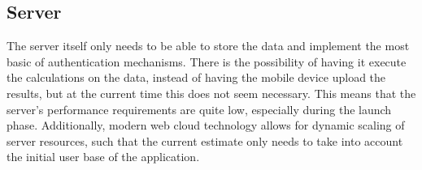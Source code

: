 \subsection{Server}
The server itself only needs to be able to store the data and implement the most
basic of authentication mechanisms. There is the possibility of having it execute
the calculations on the data, instead of having the mobile device upload the results,
but at the current time this does not seem necessary. This means that the server's
performance requirements are quite low, especially during the launch phase. Additionally,
modern web cloud technology allows for dynamic scaling of server resources, such
that the current estimate only needs to take into account the initial user base
of the application.